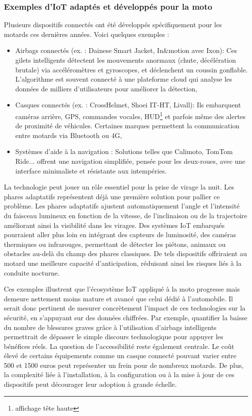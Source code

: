 \subsubsection{Exemples d’IoT adaptés et développés pour la moto}
Plusieurs dispositifs connectés ont été développés spécifiquement pour les motards ces dernières années. Voici quelques exemples :
\begin{itemize}
  \item Airbags connectés (ex. : Dainese Smart Jacket, In\&motion avec Ixon): Ces gilets intelligents détectent les mouvements anormaux (chute, décélération brutale) via accéléromètres et gyroscopes, et déclenchent un coussin gonflable. L’algorithme est souvent connecté à une plateforme cloud qui analyse les données de milliers d’utilisateurs pour améliorer la détection,
  \item Casques connectés (ex. : CrossHelmet, Shoei IT-HT, Livall): Ils embarquent caméras arrière, GPS, commandes vocales, HUD\footnote{affichage tête haute} et parfois même des alertes de proximité de véhicules. Certaines marques permettent la communication entre motards via Bluetooth ou 4G,
  \item Systèmes d’aide à la navigation : Solutions telles que Calimoto, TomTom Ride... offrent une navigation simplifiée, pensée pour les deux-roues, avec une interface minimaliste et résistante aux intempéries.
\end{itemize}
\vspace{0.5cm}
La technologie peut jouer un rôle essentiel pour la prise de virage la nuit. Les phares adaptatifs représentent déjà une première solution pour pallier ce problème. Les phares adaptatifs ajustent automatiquement l’angle et l’intensité du faisceau lumineux en fonction de la vitesse, de l’inclinaison ou de la trajectoire améliorant ainsi la visibilité dans les virages. Des systèmes IoT embarqués pourraient aller plus loin en intégrant des capteurs de luminosité, des caméras thermiques ou infrarouges, permettant de détecter les piétons, animaux ou obstacles au-delà du champ des phares classiques. De tels dispositifs offriraient au motard une meilleure capacité d’anticipation, réduisant ainsi les risques liés à la conduite nocturne.\\
\vspace{0.5cm}

Ces exemples illustrent que l’écosystème IoT appliqué à la moto progresse mais demeure nettement moins mature et avancé que celui dédié à l’automobile. Il serait donc pertinent de mesurer concrètement l’impact de ces technologies sur la sécurité, en s’appuyant sur des données chiffrées. Par exemple, quantifier la baisse du nombre de blessures graves grâce à l’utilisation d’airbags intelligents permettrait de dépasser le simple discours technologique pour appuyer les bénéfices réels.
La question de l’accessibilité reste également centrale. Le coût élevé de certains équipements comme un casque connecté pouvant varier entre 500 et 1500 euros peut représenter un frein pour de nombreux motards. De plus, la complexité liée à l’installation, à la configuration ou à la mise à jour de ces dispositifs peut décourager leur adoption à grande échelle.

